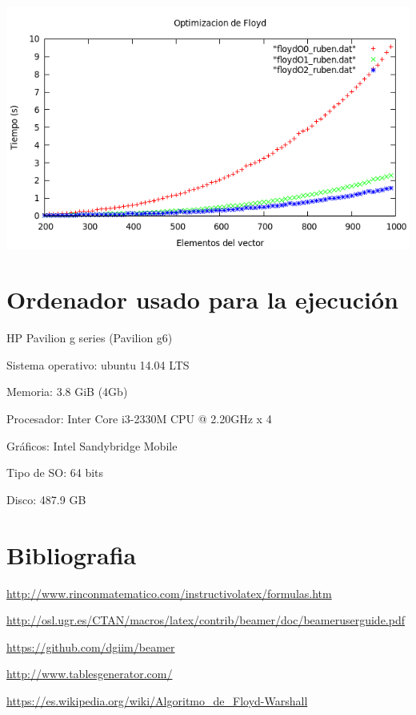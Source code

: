 \documentclass[11pt,spanish]{article} %
\begin{document}
\begin{center}
\includegraphics[scale=0.55]{../Graficas/Floyd/floyd_optimizacion.png}
\end{center}


\section{Ordenador usado para la ejecuci\'on}
HP Pavilion g series (Pavilion g6)

Sistema operativo: ubuntu 14.04 LTS

Memoria: 3.8 GiB (4Gb)

Procesador: Inter Core i3-2330M CPU @ 2.20GHz x 4

Gráficos: Intel Sandybridge Mobile

Tipo de SO: 64 bits

Disco: 487.9 GB

\newpage

\section{Bibliografia}
\url{http://www.rinconmatematico.com/instructivolatex/formulas.htm}

\url{http://osl.ugr.es/CTAN/macros/latex/contrib/beamer/doc/beameruserguide.pdf}

\url{https://github.com/dgiim/beamer}

\url{http://www.tablesgenerator.com/}

\url{https://es.wikipedia.org/wiki/Algoritmo_de_Floyd-Warshall}
\end{document}
